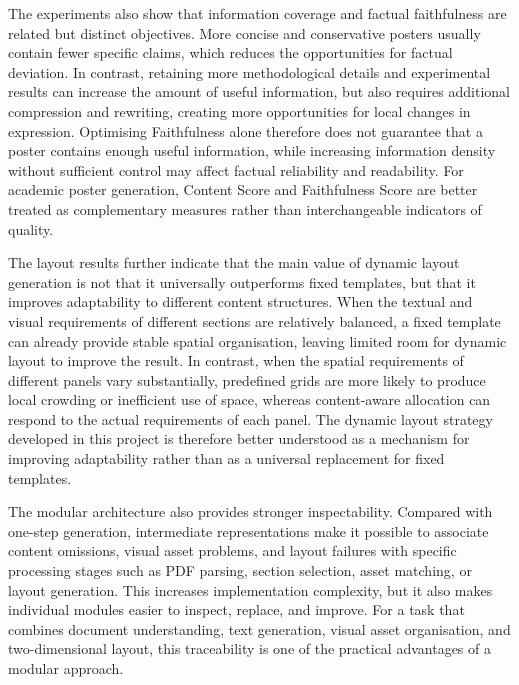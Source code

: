\documentclass[12pt,oneside]{report}
\begin{document}
\vspace{1em}

The experiments also show that information coverage and factual faithfulness are related but distinct objectives. More concise and conservative posters usually contain fewer specific claims, which reduces the opportunities for factual deviation. In contrast, retaining more methodological details and experimental results can increase the amount of useful information, but also requires additional compression and rewriting, creating more opportunities for local changes in expression. Optimising Faithfulness alone therefore does not guarantee that a poster contains enough useful information, while increasing information density without sufficient control may affect factual reliability and readability. For academic poster generation, Content Score and Faithfulness Score are better treated as complementary measures rather than interchangeable indicators of quality.

\vspace{1em}

The layout results further indicate that the main value of dynamic layout generation is not that it universally outperforms fixed templates, but that it improves adaptability to different content structures. When the textual and visual requirements of different sections are relatively balanced, a fixed template can already provide stable spatial organisation, leaving limited room for dynamic layout to improve the result. In contrast, when the spatial requirements of different panels vary substantially, predefined grids are more likely to produce local crowding or inefficient use of space, whereas content-aware allocation can respond to the actual requirements of each panel. The dynamic layout strategy developed in this project is therefore better understood as a mechanism for improving adaptability rather than as a universal replacement for fixed templates.

\vspace{1em}

The modular architecture also provides stronger inspectability. Compared with one-step generation, intermediate representations make it possible to associate content omissions, visual asset problems, and layout failures with specific processing stages such as PDF parsing, section selection, asset matching, or layout generation. This increases implementation complexity, but it also makes individual modules easier to inspect, replace, and improve. For a task that combines document understanding, text generation, visual asset organisation, and two-dimensional layout, this traceability is one of the practical advantages of a modular approach.
\end{document}

